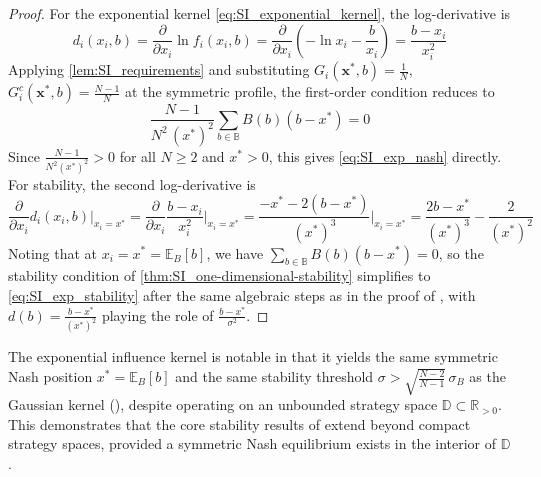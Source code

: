 \documentclass{article}
\begin{document}
            \begin{proof}
                For the exponential kernel \cref{eq:SI_exponential_kernel}, the log-derivative is
                \begin{equation}
                    d_i(x_i, b) = \frac{\partial}{\partial x_i}\ln f_i(x_i,b) = \frac{\partial}{\partial x_i}\left(-\ln x_i - \frac{b}{x_i}\right) = \frac{b - x_i}{x_i^2}
                \end{equation}
                Applying \cref{lem:SI_requirements} and substituting $G_i(\mathbf{x}^*,b) = \frac{1}{N}$, $G_i^c(\mathbf{x}^*,b) = \frac{N-1}{N}$ at the symmetric profile, the first-order condition reduces to
                \begin{equation}
                    \frac{N-1}{N^2\,(x^*)^2}\sum_{b\in\mathbb{B}} B(b)(b - x^*) = 0
                \end{equation}
                Since $\frac{N-1}{N^2(x^*)^2} > 0$ for all $N \geq 2$ and $x^* > 0$, this gives \cref{eq:SI_exp_nash} directly. For stability, the second log-derivative is
                \begin{equation}
                    \frac{\partial}{\partial x_i}d_i(x_i,b)\bigg|_{x_i = x^*} = \frac{\partial}{\partial x_i}\frac{b-x_i}{x_i^2}\bigg|_{x_i=x^*} = \frac{-x^* - 2(b-x^*)}{(x^*)^3}\bigg|_{x_i=x^*} = \frac{2b - x^*}{(x^*)^3} - \frac{2}{(x^*)^2}
                \end{equation}
                Noting that at $x_i = x^* = \mathbb{E}_B[b]$, we have $\sum_{b\in\mathbb{B}}B(b)(b-x^*) = 0$, so the stability condition of \cref{thm:SI_one-dimensional-stability} simplifies to \cref{eq:SI_exp_stability} after the same algebraic steps as in the proof of , with $d(b) = \frac{b-x^*}{(x^*)^2}$ playing the role of $\frac{b-x^*}{\sigma^2}$.
            \end{proof}
            The exponential influence kernel is notable in that it yields the same symmetric Nash position $x^* = \mathbb{E}_B[b]$ and the same stability threshold $\sigma > \sqrt{\frac{N-2}{N-1}}\,\sigma_B$ as the Gaussian kernel (), despite operating on an unbounded strategy space $\mathbb{D} \subset \mathbb{R}_{>0}$. This demonstrates that the core stability results of  extend beyond compact strategy spaces, provided a symmetric Nash equilibrium exists in the interior of $\mathbb{D}$.
\end{document}
